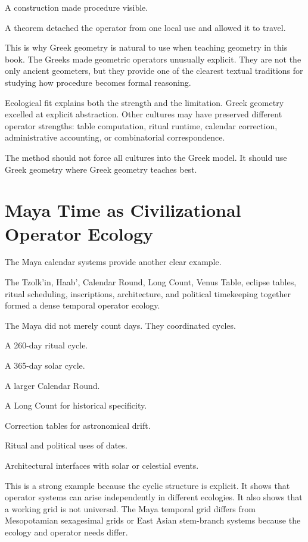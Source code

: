 \documentclass[11pt]{book}
\begin{document}
A construction made procedure visible.

A theorem detached the operator from one local use and allowed it to travel.

This is why Greek geometry is natural to use when teaching geometry in this book. The Greeks made geometric operators unusually explicit. They are not the only ancient geometers, but they provide one of the clearest textual traditions for studying how procedure becomes formal reasoning.

Ecological fit explains both the strength and the limitation. Greek geometry excelled at explicit abstraction. Other cultures may have preserved different operator strengths: table computation, ritual runtime, calendar correction, administrative accounting, or combinatorial correspondence.

The method should not force all cultures into the Greek model. It should use Greek geometry where Greek geometry teaches best.

\section{Maya Time as Civilizational Operator Ecology}

The Maya calendar systems provide another clear example.

The Tzolk'in, Haab', Calendar Round, Long Count, Venus Table, eclipse tables, ritual scheduling, inscriptions, architecture, and political timekeeping together formed a dense temporal operator ecology.

The Maya did not merely count days. They coordinated cycles.

A 260-day ritual cycle.

A 365-day solar cycle.

A larger Calendar Round.

A Long Count for historical specificity.

Correction tables for astronomical drift.

Ritual and political uses of dates.

Architectural interfaces with solar or celestial events.

This is a strong example because the cyclic structure is explicit. It shows that operator systems can arise independently in different ecologies. It also shows that a working grid is not universal. The Maya temporal grid differs from Mesopotamian sexagesimal grids or East Asian stem-branch systems because the ecology and operator needs differ.
\end{document}
